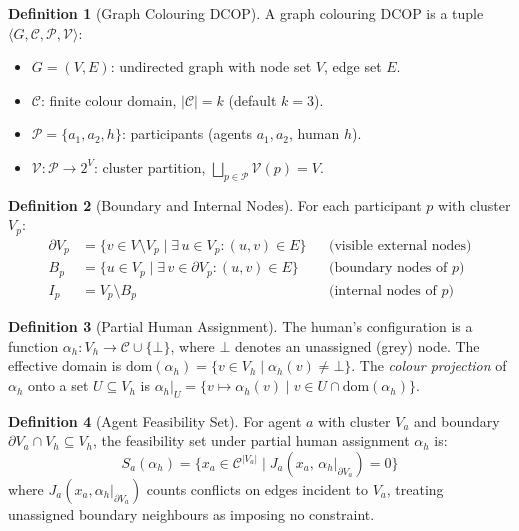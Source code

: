 \documentclass[10pt]{article}
\theoremstyle{definition}
\newtheorem{definition}{Definition}[section]
\begin{document}
\begin{definition}[Graph Colouring DCOP]
A graph colouring DCOP is a tuple $\langle G, \mathcal{C}, \mathcal{P}, \mathcal{V} \rangle$:
\begin{itemize}
  \item $G = (V, E)$: undirected graph with node set $V$, edge set $E$.
  \item $\mathcal{C}$: finite colour domain, $|\mathcal{C}| = k$ (default $k=3$).
  \item $\mathcal{P} = \{a_1, a_2, h\}$: participants (agents $a_1, a_2$, human $h$).
  \item $\mathcal{V}: \mathcal{P} \to 2^V$: cluster partition,
        $\bigsqcup_{p \in \mathcal{P}} \mathcal{V}(p) = V$.
\end{itemize}
\end{definition}

\begin{definition}[Boundary and Internal Nodes]
For each participant $p$ with cluster $V_p$:
\begin{align*}
  \partial V_p &= \{v \in V \setminus V_p \mid \exists\, u \in V_p: (u,v) \in E\}
  &&\text{(visible external nodes)}\\
  B_p &= \{u \in V_p \mid \exists\, v \in \partial V_p: (u,v) \in E\}
  &&\text{(boundary nodes of }p\text{)}\\
  I_p &= V_p \setminus B_p
  &&\text{(internal nodes of }p\text{)}
\end{align*}
\end{definition}

\begin{definition}[Partial Human Assignment]
The human's configuration is a function
$\alpha_h: V_h \to \mathcal{C} \cup \{\bot\}$,
where $\bot$ denotes an unassigned (grey) node.
The effective domain is $\mathrm{dom}(\alpha_h) = \{v \in V_h \mid \alpha_h(v) \neq \bot\}$.
The \emph{colour projection} of $\alpha_h$ onto a set $U \subseteq V_h$ is
$\alpha_h|_U = \{v \mapsto \alpha_h(v) \mid v \in U \cap \mathrm{dom}(\alpha_h)\}$.
\end{definition}

\begin{definition}[Agent Feasibility Set]
For agent $a$ with cluster $V_a$ and boundary $\partial V_a \cap V_h \subseteq V_h$,
the feasibility set under partial human assignment $\alpha_h$ is:
\[
  S_a(\alpha_h) = \bigl\{ x_a \in \mathcal{C}^{|V_a|}
    \;\big|\; J_a(x_a,\, \alpha_h|_{\partial V_a}) = 0 \bigr\}
\]
where $J_a(x_a, \alpha_h|_{\partial V_a})$ counts conflicts on edges incident to $V_a$, treating
unassigned boundary neighbours as imposing no constraint.
\end{definition}
\end{document}
